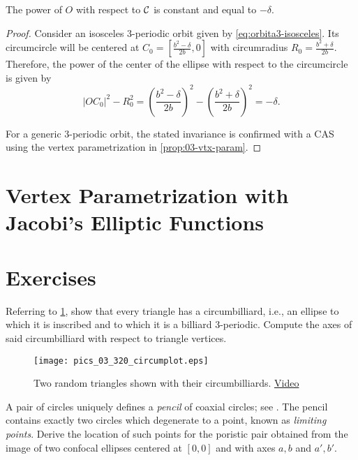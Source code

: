 \begin{proposition}
The power of $O$ with respect to $\mathcal{C}$ is constant and equal to $-\delta$.
\label{prop:03-delta}
\end{proposition}

\begin{proof}
Consider an isosceles 3-periodic orbit given by \cref{eq:orbita3-isosceles}.  
	Its circumcircle will be centered at $C_0=[ {\frac { {b}^{2}-\delta}{2b}},0]$ with circumradius $R_0=\frac {{b}^{2}+\delta}{2b}.$
	Therefore, the power of the center of the ellipse with respect to the circumcircle is given by  
	$$|OC_0|^2-R_0^2=\left(\frac { {b}^{2}-\delta}{2b}\right)^2 - \left(\frac {{b}^{2}+\delta}{2b}\right)^2=-\delta.$$
	
	For a generic 3-periodic orbit, the stated invariance is confirmed with a CAS using the vertex parametrization in \cref{prop:03-vtx-param}.  
\end{proof}

\section{Vertex Parametrization with Jacobi's Elliptic Functions}



\section{Exercises}

\begin{exercise}
\label{ex:03-circumbilliard} 
Referring to \cref{fig:03-circumbilliard}, show that every triangle has a circumbilliard, i.e., an ellipse to which it is inscribed and to which it is a billiard 3-periodic. Compute the axes of said circumbilliard with respect to triangle vertices. 
\end{exercise}

\begin{figure}
    \centering
    \texttt{[image: pics\_03\_320\_circumplot.eps]}
    \caption{Two random triangles shown with their circumbilliards. \href{https://youtu.be/vSCnorIJ2X8}{Video}}
    \label{fig:03-circumbilliard}
\end{figure}

\begin{exercise}
A pair of circles uniquely defines a {\em pencil} of coaxial circles; see \cite[Limiting Points]{mw}. The pencil contains exactly two circles which degenerate to a point, known as {\em limiting points}. Derive the location of such points for the poristic pair obtained from the image of two confocal ellipses centered at $[0,0]$ and with axes $a,b$ and $a',b'$.
\end{exercise}

